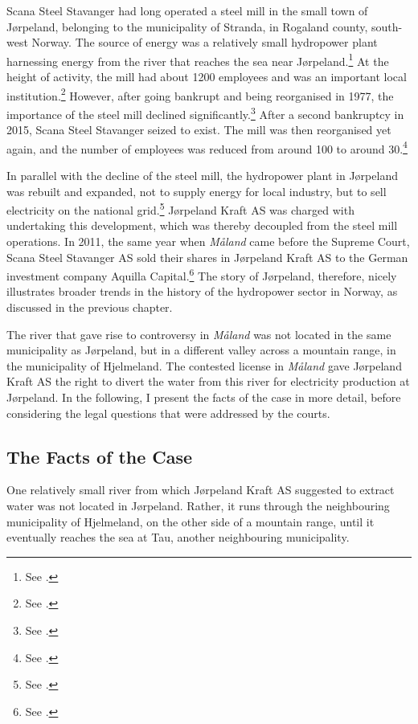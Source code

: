 Scana Steel Stavanger had long operated a steel mill in the small town of Jørpeland, belonging to the municipality of Stranda, in Rogaland county, south-west Norway. The source of energy was a relatively small hydropower plant harnessing energy from the river that reaches the sea near Jørpeland.\footnote{See \cite{aadland09}.} At the height of activity, the mill had about 1200 employees and was an important local institution.\footnote{See \cite[11]{meland82}.} However, after going bankrupt and being reorganised in 1977, the importance of the steel mill declined significantly.\footnote{See \cite[8-15]{meland82}.} After a second bankruptcy in 2015, Scana Steel Stavanger seized to exist. The mill was then reorganised yet again, and the number of employees was reduced from around 100 to around 30.\footnote{See \cite{jossang15}.}

In parallel with the decline of the steel mill, the hydropower plant in Jørpeland was rebuilt and expanded, not to supply energy for local industry, but to sell electricity on the national grid.\footnote{See \cite{aadland09}.} Jørpeland Kraft AS was charged with undertaking this development, which was thereby decoupled from the steel mill operations. In 2011, the same year when {\it Måland} came before the Supreme Court, Scana Steel Stavanger AS sold their shares in Jørpeland Kraft AS to the German investment company Aquilla Capital.\footnote{See \cite{sandvik11}.} The story of Jørpeland, therefore, nicely illustrates broader trends in the history of the hydropower sector in Norway, as discussed in the previous chapter.

The river that gave rise to controversy in {\it Måland} was not located in the same municipality as Jørpeland, but in a different valley across a mountain range, in the municipality of Hjelmeland. The contested license in {\it Måland} gave Jørpeland Kraft AS the right to divert the water from this river for electricity production at Jørpeland. In the following, I present the facts of the case in more detail, before considering the legal questions that were addressed by the courts.

\subsection{The Facts of the Case}\label{sec:5:6:1}

One relatively small river from which Jørpeland Kraft AS suggested to extract water was not located in Jørpeland. Rather, it runs through the neighbouring municipality of Hjelmeland, on the other side of a mountain range, until it eventually reaches the sea at Tau, another neighbouring municipality. 

